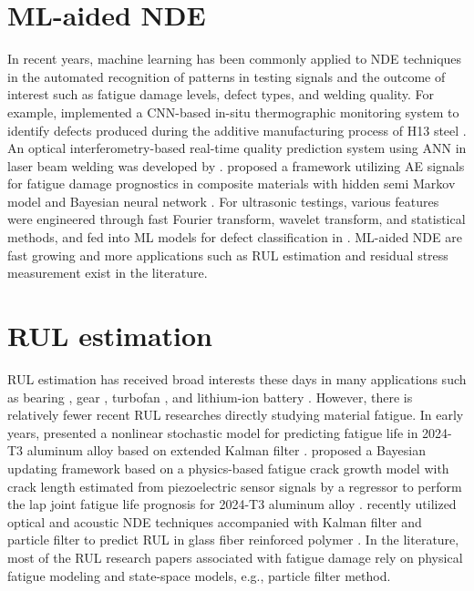 \section{ML-aided NDE}
In recent years, machine learning has been commonly applied to NDE techniques in the automated recognition of patterns in testing signals and the outcome of interest such as fatigue damage levels, defect types, and welding quality. For example,  implemented a CNN-based in-situ thermographic monitoring system to identify defects produced during the additive manufacturing process of H13 steel \cite{nde-ml-thermography-defect-Baumgartl2020}. An optical interferometry-based real-time quality prediction system using ANN in laser beam welding was developed by  \cite{nde-ml-interferometry-quality-Stad2020}.  proposed a framework utilizing AE signals for fatigue damage prognostics in composite materials with hidden semi Markov model and Bayesian neural network \cite{nde-ml-ae-fatigue-LOUTAS2017522}. For ultrasonic testings, various features were engineered through fast Fourier transform, wavelet transform, and statistical methods, and fed into ML models for defect classification in \cite{nde-lu-ml-defect-Sambath2011,nde-lu-ml-defect-s19194216}. ML-aided NDE are fast growing and more applications such as RUL estimation and residual stress measurement exist in the literature.

\section{RUL estimation}
RUL estimation has received broad interests these days in many applications such as bearing \cite{rul-nn-bearing-BENALI2015150, rul-cnn-bearing-LI20181, rul-ensemble-bearing}, gear \cite{rul-review-gear}, turbofan \cite{rul-statespace-turbo-battery-Mosallam2016,rul-cnn-turbo-LI20181,rul-rnn-turbo-WU2020241}, and lithium-ion battery \cite{rul-statespace-turbo-battery-Mosallam2016,rul-review-battery-LIPU2018115,rul-gpr-battery-9040661}. However, there is relatively fewer recent RUL researches directly studying material fatigue. In early years,  presented a nonlinear stochastic model for predicting fatigue life in 2024-T3 aluminum alloy based on extended Kalman filter \cite{rul-statespace-fatigue-RAY1996}.  proposed a Bayesian updating framework based on a physics-based fatigue crack growth model with crack length estimated from piezoelectric sensor signals by a regressor to perform the lap joint fatigue life prognosis for 2024-T3 aluminum alloy \cite{rul-statespace-fatigue-PENG2015}.  recently utilized optical and acoustic NDE techniques accompanied with Kalman filter and particle filter to predict RUL in glass fiber reinforced polymer \cite{rul-statespace-fatigue-8819426}. In the literature, most of the RUL research papers associated with fatigue damage rely on physical fatigue modeling and state-space models, e.g., particle filter method.

